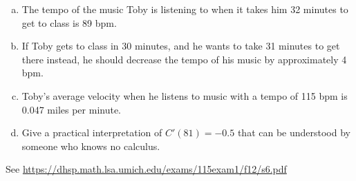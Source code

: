 \documentclass[11pt]{exam}
\begin{document}
\begin{questions}
\begin{enumerate}[(a)]
	\item The tempo of the music Toby is listening to when it takes him 32 minutes to get to class is 89 bpm.
	\item If Toby gets to class in 30 minutes, and he wants to take 31 minutes to get there instead, he should decrease the tempo of his music by approximately 4 bpm.
	\item Toby's average velocity when he listens to music with a tempo of 115 bpm is 0.047 miles per minute.
	\item Give a practical interpretation of $C'(81) = -0.5$ that can be understood by someone who knows no calculus.
\end{enumerate}
\begin{solution}
  See \href{https://dhsp.math.lsa.umich.edu/exams/115exam1/f12/s6.pdf}{https://dhsp.math.lsa.umich.edu/exams/115exam1/f12/s6.pdf}
\end{solution}
\end{questions}
\end{document}
